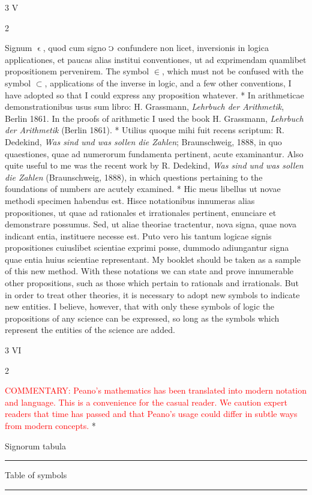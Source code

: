 \documentclass{book}
\newcommand{\s}{\switchcolumn} %
\newcommand{\C}{\mathop{\sbox0{$\displaystyle$$\reflectbox{C}$} %
\raisebox{-\height+\ht0-0.05cm}[\ht0][\dp0]{\scalebox{0.8}[0.8]{\copy0}}}\displaylimits} %
\newcommand{\smallIn}{\ensuremath{\mathrel{\epsilon}}}
\newcommand\commentary[1]{\textcolor{red}{COMMENTARY: #1}}
\newcommand\peanoHeadingMedium[1]{ \vspace{1cm} {\Large #1} \nopagebreak[4]

  \noindent\rule{1cm}{0.4pt} \nopagebreak[1]}
\newcommand{\peanoPage}[1]{\vspace{1ex}

  \columnratio{0.475, 0.05, 0.475} \begin{paracol}{3} \centering \hdashrule{\columnwidth}{0.1mm}{0.1mm 1mm} \s #1 \s \hdashrule{\columnwidth}{0.1mm}{0.1mm 1mm} \end{paracol}

\vspace{1ex}}
\newenvironment{translateTwoCol}
               { %
                 \columnratio{0.5, 0.5}
                 \begin{paracol}{2}
                 \newcommand{\LAT}{\switchcolumn[0]*}
                 \newcommand{\ENG}{\switchcolumn[1]}
               }
               { %
                 \let\ENG\undefined
                 \let\LAT\undefined
                 \end{paracol}
               }
\begin{document}
\peanoPage{V} %

\begin{translateTwoCol}
Signum $\smallIn$, quod cum signo $\C$ confundere non licet, inversionis in logica applicationes, et paucas alias institui conventiones, ut ad exprimendam quamlibet propositionem pervenirem.
\ENG
The symbol $\in$, which must not be confused with the symbol $\subset$, applications of the inverse in logic, and a few other conventions, I have adopted so that I could express any proposition whatever.
\LAT
In arithmeticae demonstrationibus usus sum libro: H. Grassmann, \emph{Lehrbuch der Arithmetik}, Berlin 1861.
\ENG
In the proofs of arithmetic I used the book H. Grassmann, \emph{Lehrbuch der Arithmetik} (Berlin 1861).
\LAT
Utilius quoque mihi fuit recens scriptum: R. Dedekind, \emph{Was sind und was sollen die Zahlen}; Braunschweig, 1888, in quo quaestiones, quae ad numerorum fundamenta pertinent, acute examinantur.
\ENG
Also quite useful to me was the recent work by R. Dedekind, \emph{Was sind und was sollen die Zahlen} (Braunschweig, 1888), in which questions pertaining to the foundations of numbers are acutely examined.
\LAT
Hic meus libellus ut novae methodi specimen habendus est. Hisce notationibus innumeras alias propositiones, ut quae ad rationales et irrationales pertinent, enunciare et demonstrare possumus. Sed, ut aliae theoriae tractentur, nova signa, quae nova indicant entia, instituere necesse est. Puto vero his tantum logicae signis propositiones cuiuslibet scientiae exprimi posse, dummodo adiungantur signa quae entia huius scientiae representant.
\ENG
My booklet should be taken as a sample of this new method. With these notations we can state and prove innumerable other propositions, such as those which pertain to rationals and irrationals. But in order to treat other theories, it is necessary to adopt new symbols to indicate new entities. I believe, however, that with only these symbols of logic the propositions of any science can be expressed, so long as the symbols which represent the entities of the science are added.
\end{translateTwoCol}

\peanoPage{VI} %

\begin{translateTwoCol}
\ENG
\commentary{Peano's mathematics has been translated into modern notation and language.  This is a convenience for the casual reader.  We caution expert readers that time has passed and that Peano's usage could differ in subtle ways from modern concepts.}  
\LAT  
\centering
{}
{}
\peanoHeadingMedium{Signorum tabula}
\ENG
\peanoHeadingMedium{Table of symbols}
\end{translateTwoCol}
\end{document}
